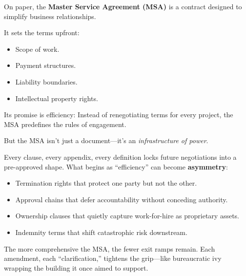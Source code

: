 \begin{tcolorbox}[colback=blue!5!white, colframe=blue!50!black, breakable,
  title={Philosophical Sidebar: The Master Service Agreement as a Weapon of Control}]

On paper, the \textbf{Master Service Agreement (MSA)} is a contract designed to simplify business relationships.

\medskip

It sets the terms upfront:

\medskip

\begin{itemize}
    \item Scope of work.
    \item Payment structures.
    \item Liability boundaries.
    \item Intellectual property rights.
\end{itemize}

\medskip

Its promise is efficiency:  Instead of renegotiating terms for every project, the MSA predefines the rules of engagement.

\medskip

But the MSA isn’t just a document—it’s an \textit{infrastructure of power}.

\medskip

Every clause, every appendix, every definition locks future negotiations into a pre-approved shape.  What begins as “efficiency” can become \textbf{asymmetry}:

\medskip

\begin{itemize}
    \item Termination rights that protect one party but not the other.
    \item Approval chains that defer accountability without conceding authority.
    \item Ownership clauses that quietly capture work-for-hire as proprietary assets.
    \item Indemnity terms that shift catastrophic risk downstream.
\end{itemize}

\medskip

The more comprehensive the MSA, the fewer exit ramps remain.  Each amendment, each “clarification,” tightens the grip—like bureaucratic ivy wrapping the building it once aimed to support.

\medskip


\end{tcolorbox}
